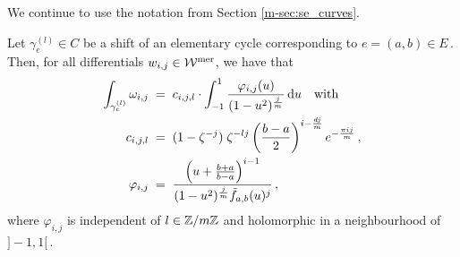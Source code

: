 \documentclass[main.tex]{subfiles}
\begin{document}
  We continue to use the notation from Section \ref{m-sec:se_curves}. 
  
  \begin{thm}\label{thm:periods}
   Let $\gamma_e^{(l)} \in C$ be a shift of an elementary cycle corresponding to $e = (a,b) \in E$\,. Then, for all differentials $w_{i,j} \in \mathcal{W}^{\text{mer}}$, we have that
   \begin{align}\label{eq:thm_periods_1}
   \begin{split}
    \int_{\gamma_e^{(l)}} \omega_{i,j} \; & = \; c_{i,j,l} \cdot \int_{-1}^1 \frac{\varphi_{i,j}(u)}{(1-u^2)^{\frac{j}{m}}} \, \mathrm d u \quad \text{with} \\
    c_{i,j,l} \;  & = \; (1-\zeta^{-j}) \; \zeta^{-lj} \left(\frac{b-a}{2}\right)^{i-\frac{dj}{m}} e^{-\frac{\pi i j}{m}} \,, \\ 
    \varphi_{i,j} \; & = \;
    \frac{\left(u+\frac{b+a}{b-a}\right)^{i-1}}{(1-u^2)^{\frac{j}{m}}\tilde{f}_{a,b}(u)^j}\,,
    \end{split}
   \end{align}
   where $\varphi_{i,j}$ is independent of $l \in \mathbb{Z}/m\mathbb{Z}$ and holomorphic in a neighbourhood of $]\!-1,1[$\,.

  \end{thm}
\end{document}
